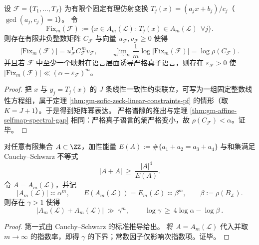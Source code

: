 \begin{theorem}\label{thm:gm-multi-affine-closure-decay}
设 \(\mathcal{F}=\{T_1,\dots,T_J\}\) 为有限个固定有理仿射变换 \(T_j(x)=(a_jx+b_j)/c_j\)（\(\gcd(a_j,c_j)=1\)）。
令
\[
\mathrm{Fix}_m(\mathcal{F})
:=\{x\in A_m(\mathcal{L}):\ T_j(x)\in A_m(\mathcal{L})\ \ \forall j\}.
\]
则存在有限非负整数矩阵 \(C_{\mathcal{F}}\) 与向量 \(u_{\mathcal{F}},v_{\mathcal{F}}\ge 0\) 使得
\[
|\mathrm{Fix}_m(\mathcal{F})|
=u_{\mathcal{F}}^{\mathsf T}C_{\mathcal{F}}^{\,m}v_{\mathcal{F}},
\qquad
\lim_{m\to\infty}\frac{1}{m}\log|\mathrm{Fix}_m(\mathcal{F})|
=\log\rho(C_{\mathcal{F}}).
\]
并且若 \(\mathcal{F}\) 中至少一个映射在语言层面诱导严格真子语言，则存在 \(\varepsilon_{\mathcal{F}}>0\) 使
\(
|\mathrm{Fix}_m(\mathcal{F})|\ll (\alpha-\varepsilon_{\mathcal{F}})^m
\)。
\end{theorem}

\begin{proof}
把 \(x\) 与 \(y_j=T_j(x)\) 的 \(J\) 条线性一致性约束联立，可写为一组固定整数线性方程组，属于定理 \ref{thm:gm-sofic-zeck-linear-constraints-pf} 的情形（取 \(K=J+1\)）。于是得到矩阵幂表达。
严格谱隙的推出与定理 \ref{thm:gm-affine-selfmap-spectral-gap} 相同：严格真子语言的熵严格变小，故 \(\rho(C_{\mathcal{F}})<\alpha\)。证毕。
\end{proof}

\begin{proposition}\label{prop:gm-energy-sumset-exponent}
对任意有限集合 \(A\subset\ZZ\)，加性能量
\(
E(A):=\#\{a_1+a_2=a_3+a_4\}
\)
与和集满足 Cauchy--Schwarz 不等式
\[
|A+A|\ \ge\ \frac{|A|^4}{E(A)}.
\]
令 \(A=A_m(\mathcal{L})\)，并记
\[
|A_m(\mathcal{L})|\asymp \alpha^m,\qquad
E(A_m(\mathcal{L}))=E_m(\mathcal{L})\asymp \beta^m,\qquad \beta:=\rho(B_{\mathcal{L}}).
\]
则存在 \(\gamma>1\) 使得
\[
|A_m(\mathcal{L})+A_m(\mathcal{L})|\ \gg\ \gamma^m,
\qquad
\boxed{\ \log\gamma\ \ge\ 4\log\alpha-\log\beta\ }.
\]
\end{proposition}

\begin{proof}
第一式由 Cauchy--Schwarz 的标准推导给出。
将 \(A=A_m(\mathcal{L})\) 代入并取 \(m\to\infty\) 的指数率，即得 \(\gamma\) 的下界；常数因子仅影响次指数项。证毕。
\end{proof}

